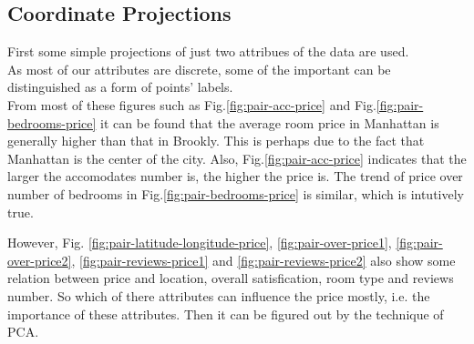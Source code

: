 \documentclass[12pt]{article}
\begin{document}
\subsection{Coordinate Projections}
First some simple projections of just two attribues of the data are used.\\
As most of our attributes are discrete, some of the important can be distinguished as a form of points' labels.  
\\ From most of these figures such as Fig.\ref{fig:pair-acc-price} and Fig.\ref{fig:pair-bedrooms-price} it can be found that the average room price in Manhattan is generally higher than that in Brookly. This is perhaps due to the fact that Manhattan is the center of the city. Also, Fig.\ref{fig:pair-acc-price} indicates that the larger the accomodates number is, the higher the price is. The trend of price over number of bedrooms in Fig.\ref{fig:pair-bedrooms-price} is similar, which is intutively true.
\par However, Fig. \ref{fig:pair-latitude-longitude-price}, \ref{fig:pair-over-price1}, \ref{fig:pair-over-price2}, \ref{fig:pair-reviews-price1} and \ref{fig:pair-reviews-price2} also show some relation  between price and location, overall satisfication, room type and reviews number. So which of there attributes can influence the price mostly, i.e. the importance of these attributes. Then it can be figured out by the technique of PCA.
\end{document}
